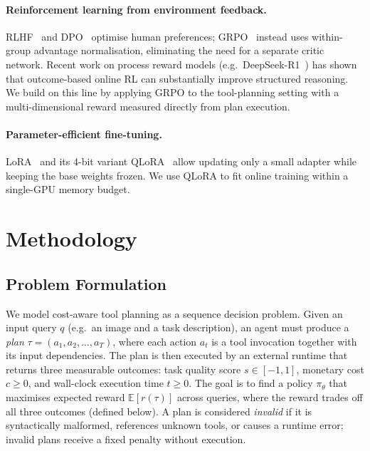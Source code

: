 \documentclass[10pt,twocolumn]{article}
\begin{document}
\paragraph{Reinforcement learning from environment feedback.}
RLHF~\cite{ouyang2022training} and DPO~\cite{rafailov2023direct} optimise
human preferences; GRPO~\cite{shao2024deepseekmath} instead uses
within-group advantage normalisation, eliminating the need for a separate
critic network.
Recent work on process reward models
(e.g.\ DeepSeek-R1~\cite{guo2025deepseek}) has shown that outcome-based
online RL can substantially improve structured reasoning.
We build on this line by applying GRPO to the tool-planning setting with a
multi-dimensional reward measured directly from plan execution.

\paragraph{Parameter-efficient fine-tuning.}
LoRA~\cite{hu2022lora} and its 4-bit variant QLoRA~\cite{dettmers2023qlora}
allow updating only a small adapter while keeping the base weights frozen.
We use QLoRA to fit online training within a single-GPU memory budget.


\section{Methodology}

\subsection{Problem Formulation}
We model cost-aware tool planning as a sequence decision problem.
Given an input query $q$ (e.g.\ an image and a task description), an agent
must produce a \emph{plan} $\tau = (a_1, a_2, \ldots, a_T)$, where each
action $a_t$ is a tool invocation together with its input dependencies.
The plan is then executed by an external runtime that returns three
measurable outcomes: task quality score $s \in [-1, 1]$, monetary cost
$c \geq 0$, and wall-clock execution time $t \geq 0$.
The goal is to find a policy $\pi_\theta$ that maximises expected reward
$\mathbb{E}[r(\tau)]$ across queries, where the reward trades off all three
outcomes (defined below).
A plan is considered \emph{invalid} if it is syntactically malformed,
references unknown tools, or causes a runtime error; invalid plans receive
a fixed penalty without execution.
\end{document}
